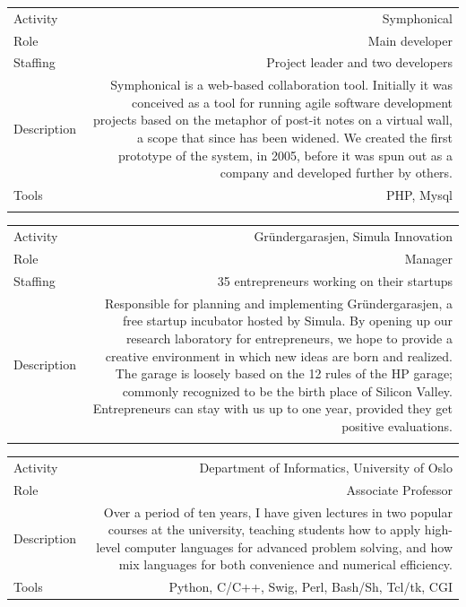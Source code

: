 \documentclass[english,a4paper,11pt]{article}
\begin{document}
\begin{tabular}{@{}LR}
Activity & Symphonical \\
Role & Main developer \\
Staffing & Project leader and two developers \\
Description & Symphonical is a web-based collaboration tool. Initially it was conceived as a tool for running agile software development projects based on the metaphor of post-it notes on a virtual wall, a scope that since has been widened. We created the first prototype of the system, in 2005, before it was spun out as a company and developed further by others. \\
Tools & PHP, Mysql \\ 
\addlinespace \bottomrule[.1pt] \addlinespace
   \end{tabular}

\begin{tabular}{@{}LR}
Activity & Gründergarasjen, Simula Innovation\\
Role & Manager\\
Staffing & 35 entrepreneurs working on their startups\\
Description & Responsible for planning and implementing Gründergarasjen, a free startup incubator hosted by Simula. By opening up our research laboratory for entrepreneurs, we hope to provide a creative environment in which new ideas are born and realized. The garage is loosely based on the 12 rules of the HP garage; commonly recognized to be the birth place of Silicon Valley. Entrepreneurs can stay with us up to one year, provided they get positive evaluations.\\ 
\addlinespace \bottomrule[.1pt] \addlinespace
   \end{tabular}

\begin{tabular}{@{}LR}
Activity & Department of Informatics, University of Oslo\\
Role & Associate Professor\\
Description & Over a period of ten years, I have given lectures in two popular courses at the university, teaching students how to apply high-level computer languages for advanced problem solving, and how mix languages for both convenience and numerical efficiency.\\
Tools & Python, C/C++, Swig, Perl, Bash/Sh, Tcl/tk, CGI\\ 
\end{tabular}
\end{document}
